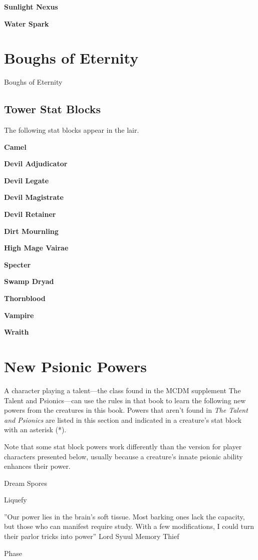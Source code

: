 \documentclass[10pt,a4paper,twoside,bg=print,twocolumn,openany,nodeprecatedcode]{dndbook}
\begin{document}
\textbf{Sunlight Nexus}

\textbf{Water Spark}

\chapter{Boughs of Eternity}
Boughs of Eternity

\section{Tower Stat Blocks}
The following stat blocks appear in the lair.

\textbf{Camel}

\textbf{Devil Adjudicator}

\textbf{Devil Legate}

\textbf{Devil Magistrate}

\textbf{Devil Retainer}

\textbf{Dirt Mournling}

\textbf{High Mage Vairae}

\textbf{Specter}

\textbf{Swamp Dryad}

\textbf{Thornblood}

\textbf{Vampire}

\textbf{Wraith}

\chapter{New Psionic Powers}
A character playing a talent—the class found in the MCDM supplement The Talent and Psionics—can use the rules in that book to learn the following new powers from the creatures in this book. Powers that aren't found in \textit{The Talent and Psionics} are listed in this section and indicated in a creature's stat block with an asterisk (*).

Note that some stat block powers work differently than the version for player characters presented below, usually because a creature's innate psionic ability enhances their power.

Dream Spores

Liquefy

\DndQuote%
{}
{''Our power lies in the brain's soft tissue. Most barking ones lack the capacity, but those who can manifest require study. With a few modifications, I could turn their parlor tricks into power''}
{Lord Syuul}
Memory Thief

Phase
\end{document}
